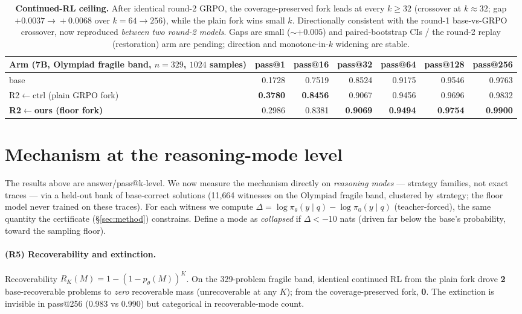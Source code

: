 \documentclass[11pt]{article}
\theoremstyle{definition}
\begin{document}
\begin{table}[h]\centering\small
\begin{tabular}{lrrrrrr}
\toprule
Arm (7B, Olympiad fragile band, $n{=}329$, $1024$ samples) & pass@1 & pass@16 & pass@32 & pass@64 & pass@128 & pass@256\\
\midrule
base                              & 0.1728 & 0.7519 & 0.8524 & 0.9175 & 0.9546 & 0.9763\\
R2$\leftarrow$ctrl (plain GRPO fork)      & \textbf{0.3780} & \textbf{0.8456} & 0.9067 & 0.9456 & 0.9696 & 0.9832\\
\textbf{R2$\leftarrow$ours (floor fork)}  & 0.2986 & 0.8381 & \textbf{0.9069} & \textbf{0.9494} & \textbf{0.9754} & \textbf{0.9900}\\
\bottomrule
\end{tabular}
\caption{\textbf{Continued-RL ceiling.} After identical round-2 GRPO, the coverage-preserved fork leads
at every $k\ge32$ (crossover at $k\!\approx\!32$; gap $+0.0037\!\to\!+0.0068$ over $k{=}64\!\to\!256$),
while the plain fork wins small $k$. Directionally consistent with the round-1 base-vs-GRPO crossover,
now reproduced \emph{between two round-2 models}. Gaps are small ($\sim{+}0.005$) and paired-bootstrap
CIs / the round-2 replay (restoration) arm are pending; direction and monotone-in-$k$ widening are
stable.}
\label{tab:round2}
\end{table}

\section{Mechanism at the reasoning-mode level}
\label{sec:modelevel}
The results above are answer/pass@k-level. We now measure the mechanism directly on \emph{reasoning
modes} --- strategy families, not exact traces --- via a held-out bank of base-correct solutions
(11{,}664 witnesses on the Olympiad fragile band, clustered by strategy; the floor model never
trained on these traces). For each witness we compute $\Delta = \log\pi_\theta(y\mid q) - \log\pi_0(y\mid q)$
(teacher-forced), the same quantity the certificate (\S\ref{sec:method}) constrains. Define a mode as
\emph{collapsed} if $\Delta < -10$ nats (driven far below the base's probability, toward the sampling
floor).

\paragraph{(R5) Recoverability and extinction.} Recoverability $R_K(M)=1-(1-p_\theta(M))^K$. On the
329-problem fragile band, identical continued RL from the plain fork drove \textbf{2} base-recoverable
problems to \emph{zero} recoverable mass (unrecoverable at any $K$); from the coverage-preserved fork,
\textbf{0}. The extinction is invisible in pass@256 (0.983 vs 0.990) but categorical in recoverable-mode count.
\end{document}
